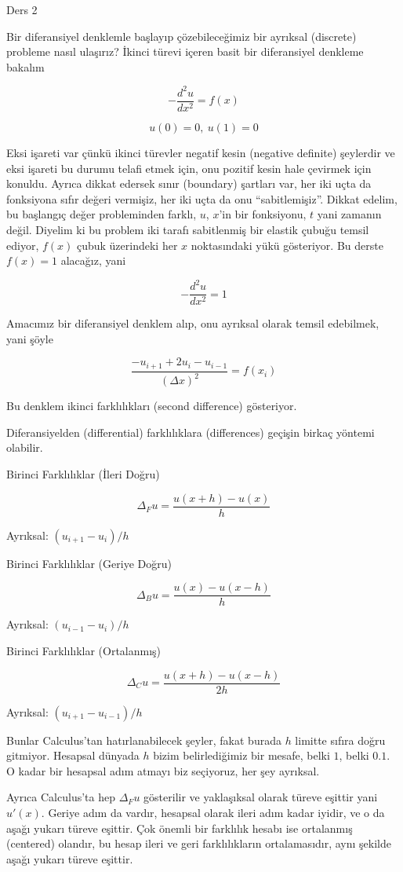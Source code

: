 \documentclass[12pt,fleqn]{article}\usepackage{../../common}
\begin{document}
Ders 2

Bir diferansiyel denklemle başlayıp çözebileceğimiz bir ayrıksal (discrete)
probleme nasıl ulaşırız? İkinci türevi içeren basit bir diferansiyel
denkleme bakalım

$$ -\frac{d^2u}{dx^2} = f(x) $$

$$ u(0) = 0, \ u(1) = 0 $$

Eksi işareti var çünkü ikinci türevler negatif kesin (negative definite)
şeylerdir ve eksi işareti bu durumu telafi etmek için, onu pozitif kesin
hale çevirmek için konuldu. Ayrıca dikkat edersek sınır (boundary) şartları
var, her iki uçta da fonksiyona sıfır değeri vermişiz, her iki uçta da onu
``sabitlemişiz''. Dikkat edelim, bu başlangıç değer probleminden farklı,
$u$, $x$'in bir fonksiyonu, $t$ yani zamanın değil. Diyelim ki bu problem
iki tarafı sabitlenmiş bir elastik çubuğu temsil ediyor, $f(x)$ çubuk
üzerindeki her $x$ noktasındaki yükü gösteriyor. Bu derste $f(x) = 1$
alacağız, yani

$$ -\frac{d^2u}{dx^2} = 1 $$

Amacımız bir diferansiyel denklem alıp, onu ayrıksal olarak temsil edebilmek,
yani şöyle

$$ \frac{-u_{i+1}+2u_i - u_{i-1}}{(\Delta x)^2} = f(x_i)$$

Bu denklem ikinci farklılıkları (second difference) gösteriyor. 

Diferansiyelden (differential) farklılıklara (differences) geçişin birkaç
yöntemi olabilir. 

Birinci Farklılıklar (İleri Doğru)

$$ \Delta_Fu = \frac{u(x+h)-u(x)}{h} $$

Ayrıksal: $(u_{i+1} - u_{i}) / h$

Birinci Farklılıklar (Geriye Doğru)

$$ \Delta_Bu = \frac{u(x)-u(x-h)}{h} $$

Ayrıksal: $(u_{i-1} - u_{i}) / h$

Birinci Farklılıklar (Ortalanmış)

$$ \Delta_Cu = \frac{u(x+h)-u(x-h)}{2h} $$

Ayrıksal: $(u_{i+1} - u_{i-1}) / h$

Bunlar Calculus'tan hatırlanabilecek şeyler, fakat burada $h$ limitte
sıfıra doğru gitmiyor. Hesapsal dünyada $h$ bizim belirlediğimiz bir
mesafe, belki $1$, belki $0.1$. O kadar bir hesapsal adım atmayı biz
seçiyoruz, her şey ayrıksal. 

Ayrıca Calculus'ta hep $\Delta_F u$ gösterilir ve yaklaşıksal olarak türeve
eşittir yani $u'(x)$. Geriye adım da vardır, hesapsal olarak ileri adım
kadar iyidir, ve o da aşağı yukarı türeve eşittir. Çok önemli bir farklılık
hesabı ise ortalanmış (centered) olandır, bu hesap ileri ve geri
farklılıkların ortalamasıdır, aynı şekilde aşağı yukarı türeve eşittir.
\end{document}
